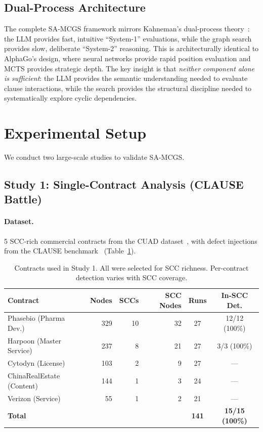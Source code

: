 \documentclass{article}
\begin{document}
\subsection{Dual-Process Architecture}

The complete SA-MCGS framework mirrors Kahneman's dual-process theory~\cite{kahneman}: the LLM provides fast, intuitive ``System-1'' evaluations, while the graph search provides slow, deliberate ``System-2'' reasoning. This is architecturally identical to AlphaGo's design, where neural networks provide rapid position evaluation and MCTS provides strategic depth. The key insight is that \emph{neither component alone is sufficient}: the LLM provides the semantic understanding needed to evaluate clause interactions, while the search provides the structural discipline needed to systematically explore cyclic dependencies.

\section{Experimental Setup}

We conduct two large-scale studies to validate SA-MCGS.

\subsection{Study 1: Single-Contract Analysis (CLAUSE Battle)}

\paragraph{Dataset.} 5 SCC-rich commercial contracts from the CUAD dataset~\cite{cuad}, with defect injections from the CLAUSE benchmark~\cite{clause} (Table~\ref{tab:contracts}).

\begin{table}[t]
\caption{Contracts used in Study 1. All were selected for SCC richness. Per-contract detection varies with SCC coverage.}
\label{tab:contracts}
\centering
\small
\begin{tabular}{lrrrcc}
\toprule
\textbf{Contract} & \textbf{Nodes} & \textbf{SCCs} & \textbf{SCC Nodes} & \textbf{Runs} & \textbf{In-SCC Det.} \\
\midrule
Phasebio (Pharma Dev.) & 329 & 10 & 32 & 27 & 12/12 (100\%) \\
Harpoon (Master Service) & 237 & 8 & 21 & 27 & 3/3 (100\%) \\
Cytodyn (License) & 103 & 2 & 9 & 27 & --- \\
ChinaRealEstate (Content) & 144 & 1 & 3 & 24 & --- \\
Verizon (Service) & 55 & 1 & 2 & 21 & --- \\
\midrule
\textbf{Total} & & & & \textbf{141} & \textbf{15/15 (100\%)} \\
\bottomrule
\end{tabular}
\end{table}
\end{document}
